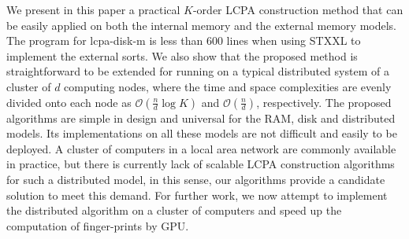 \documentclass{llncs}
\begin{document}
We present in this paper a practical $K$-order LCPA construction method that can be easily applied on both the internal memory and the external memory models. The program for lcpa-disk-m is less than 600 lines when using STXXL to implement the external sorts. We also show that the proposed method is straightforward to be extended for running on a typical distributed system of a cluster of $d$ computing nodes, where the time and space complexities are evenly divided onto each node as $\mathcal{O}(\frac{n}{d}\log K)$ and $\mathcal{O}(\frac{n}{d})$, respectively. The proposed algorithms are simple in design and universal for the RAM, disk and distributed models. Its implementations on all these models are not difficult and easily to be deployed.
A cluster of computers in a local area network are commonly available in practice, but there is currently lack of scalable LCPA construction algorithms for such a distributed model, in this sense, our algorithms provide a candidate solution to meet this demand. For further work, we now attempt to implement the distributed algorithm on a cluster of computers and speed up the computation of finger-prints by GPU.



\end{document}
